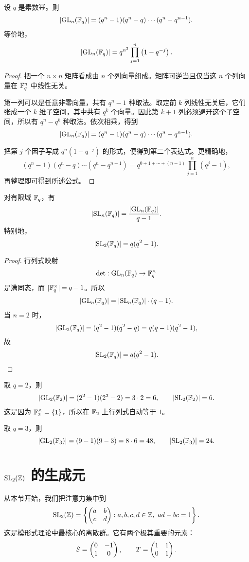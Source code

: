 \begin{proposition}
设 $q$ 是素数幂。则
\[
|\mathrm{GL}_n(\mathbb{F}_q)|=(q^n-1)(q^n-q)\cdots(q^n-q^{n-1}).
\]
等价地，
\[
|\mathrm{GL}_n(\mathbb{F}_q)|=q^{n^2}\prod_{j=1}^n\left(1-q^{-j}\right).
\]
\end{proposition}

\begin{proof}
把一个 $n\times n$ 矩阵看成由 $n$ 个列向量组成。矩阵可逆当且仅当这 $n$ 个列向量在 $\mathbb{F}_q^n$ 中线性无关。

第一列可以是任意非零向量，共有 $q^n-1$ 种取法。取定前 $k$ 列线性无关后，它们张成一个 $k$ 维子空间，其中共有 $q^k$ 个向量。因此第 $k+1$ 列必须避开这个子空间，所以有 $q^n-q^k$ 种取法。依次相乘，得到
\[
|\mathrm{GL}_n(\mathbb{F}_q)|=(q^n-1)(q^n-q)\cdots(q^n-q^{n-1}).
\]

把第 $j$ 个因子写成 $q^n(1-q^{-j})$ 的形式，便得到第二个表达式。更精确地，
\[
(q^n-1)(q^n-q)\cdots(q^n-q^{n-1})
= q^{0+1+\cdots+(n-1)}\prod_{j=1}^n(q^j-1),
\]
再整理即可得到所述公式。
\end{proof}

\begin{corollary}
对有限域 $\mathbb{F}_q$，有
\[
|\mathrm{SL}_n(\mathbb{F}_q)|=\frac{|\mathrm{GL}_n(\mathbb{F}_q)|}{q-1}.
\]
特别地，
\[
|\mathrm{SL}_2(\mathbb{F}_q)|=q(q^2-1).
\]
\end{corollary}

\begin{proof}
行列式映射
\[
\det:\mathrm{GL}_n(\mathbb{F}_q)\to \mathbb{F}_q^\times
\]
是满同态，而 $|\mathbb{F}_q^\times|=q-1$。所以
\[
|\mathrm{GL}_n(\mathbb{F}_q)|=|\mathrm{SL}_n(\mathbb{F}_q)|\cdot(q-1).
\]
当 $n=2$ 时，
\[
|\mathrm{GL}_2(\mathbb{F}_q)|=(q^2-1)(q^2-q)=q(q-1)(q^2-1),
\]
故
\[
|\mathrm{SL}_2(\mathbb{F}_q)|=q(q^2-1).
\]
\end{proof}

\begin{example}
取 $q=2$，则
\[
|\mathrm{GL}_2(\mathbb{F}_2)|=(2^2-1)(2^2-2)=3\cdot 2=6,
\qquad
|\mathrm{SL}_2(\mathbb{F}_2)|=6.
\]
这是因为 $\mathbb{F}_2^\times=\{1\}$，所以在 $\mathbb{F}_2$ 上行列式自动等于 $1$。

取 $q=3$，则
\[
|\mathrm{GL}_2(\mathbb{F}_3)|=(9-1)(9-3)=8\cdot 6=48,
\qquad
|\mathrm{SL}_2(\mathbb{F}_3)|=24.
\]
\end{example}

\section{$\mathrm{SL}_2(\mathbb{Z})$ 的生成元}

从本节开始，我们把注意力集中到
\[
\mathrm{SL}_2(\mathbb{Z})=\left\{\begin{pmatrix} a&b\\ c&d \end{pmatrix}:a,b,c,d\in\mathbb{Z},\ ad-bc=1\right\}.
\]
这是模形式理论中最核心的离散群。它有两个极其重要的元素：
\[
S=\begin{pmatrix} 0&-1\\ 1&0 \end{pmatrix},
\qquad
T=\begin{pmatrix} 1&1\\ 0&1 \end{pmatrix}.
\]

